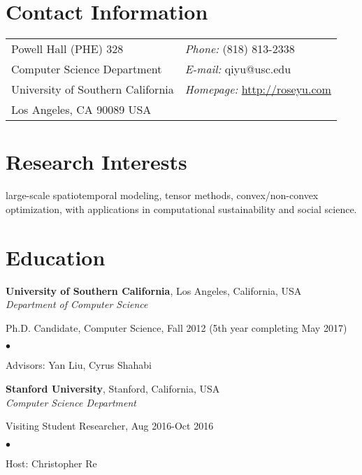 \documentclass[margin,line]{res}
\newenvironment{list1}{
  \begin{list}{\ding{113}}{%
      \setlength{\itemsep}{0in}
      \setlength{\parsep}{0in} \setlength{\parskip}{0in}
      \setlength{\topsep}{0in} \setlength{\partopsep}{0in} 
      \setlength{\leftmargin}{0.17in}}}{\end{list}}
\newenvironment{list2}{
  \begin{list}{$\bullet$}{%
      \setlength{\itemsep}{0in}
      \setlength{\parsep}{0in} \setlength{\parskip}{0in}
      \setlength{\topsep}{0in} \setlength{\partopsep}{0in} 
      \setlength{\leftmargin}{0.2in}}}{\end{list}}
\begin{document}

\begin{resume}
\section{\sc Contact Information}
\vspace{.05in}
\begin{tabular}{@{}p{2in}p{4in}}
Powell Hall (PHE) 328 & {\it Phone:}  (818) 813-2338 \\            
Computer Science Department  & {\it E-mail:}  qiyu@usc.edu  \\         
University of Southern California & {\it Homepage:} \url{http://roseyu.com} \\       
Los Angeles, CA 90089 USA  & \\     
\end{tabular}


\section{\sc Research Interests}
large-scale spatiotemporal modeling, tensor methods, convex/non-convex optimization, with applications in computational sustainability and social science.

\section{\sc Education}
{\bf University of Southern California}, Los Angeles, California, USA\\
{\em Department of Computer Science} 
\begin{list1}
\item[] Ph.D. Candidate, Computer Science,  Fall 2012 (5th year completing May 2017) 
\begin{list2}
\vspace*{.05in}
\item Advisors:  Yan Liu, Cyrus Shahabi
\end{list2}


\vspace*{.05in}
\end{list1}
{\bf Stanford University}, Stanford, California, USA\\
{\em Computer Science Department } 
\begin{list1}
	\item[] Visiting Student Researcher,  Aug 2016-Oct 2016
	\begin{list2}
		\vspace*{.05in}
		\item Host:  Christopher Re
	\end{list2}
\end{list1}


\end{resume}
\end{document}
